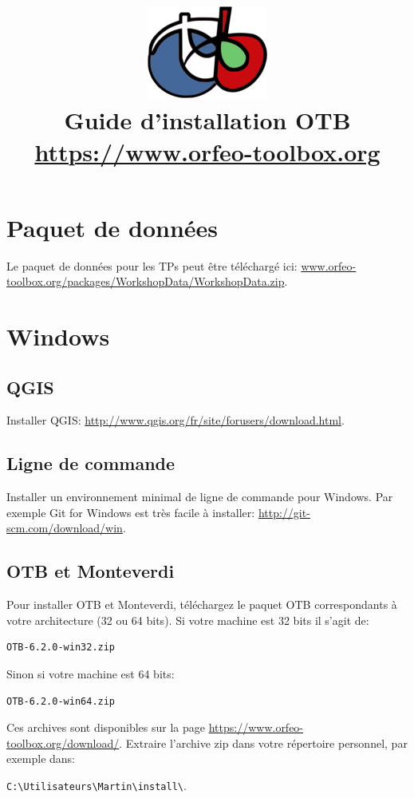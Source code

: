 \documentclass[10pt,a4paper]{article}
\title{\includegraphics[scale=1]{Art/otb-logo.png}\\
  Guide d'installation OTB\\
  {\small\url{https://www.orfeo-toolbox.org}}
}
\begin{document}
\maketitle

\tableofcontents

\clearpage
\section{Paquet de données}

Le paquet de données pour les TPs peut être téléchargé ici: \url{www.orfeo-toolbox.org/packages/WorkshopData/WorkshopData.zip}.

\section{Windows}

\subsection{QGIS}
Installer QGIS: \url{http://www.qgis.org/fr/site/forusers/download.html}.

\subsection{Ligne de commande}
Installer un environnement minimal de ligne de commande pour Windows. Par exemple
Git for Windows est très facile à installer:
\url{http://git-scm.com/download/win}.

\subsection{OTB et Monteverdi}
Pour installer OTB et Monteverdi, téléchargez le paquet OTB correspondants à
votre architecture (32 ou 64 bits). Si votre machine est 32
bits il s'agit de:

\begin{verbatim}
OTB-6.2.0-win32.zip
\end{verbatim}

Sinon si votre machine est 64 bits:

\begin{verbatim}
OTB-6.2.0-win64.zip
\end{verbatim}

Ces archives sont disponibles sur la page
\url{https://www.orfeo-toolbox.org/download/}.
Extraire l'archive zip dans votre répertoire personnel, par exemple dans:\\
\begin{centering}
\texttt{C:{\textbackslash}Utilisateurs{\textbackslash}Martin{\textbackslash}install{\textbackslash}}.
\end{centering}
\end{document}
